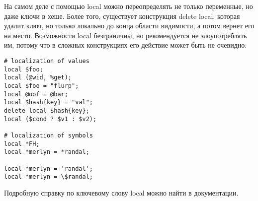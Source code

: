 На самом деле с помощью local можно переопределять не только переменные, но даже ключи в хеше. Более того, существует конструкция delete local, которая удалит ключ, но только локально до конца области видимости, а потом вернет его на место. Возможности local безграничны, но рекомендуется не злоупотреблять им, потому что в сложных конструкциях его действие может быть не очевидно:
\begin{verbatim}
# localization of values
local $foo;
local (@wid, %get);
local $foo = "flurp";
local @oof = @bar;
local $hash{key} = "val";
delete local $hash{key};
local ($cond ? $v1 : $v2);

# localization of symbols
local *FH;
local *merlyn = *randal;

local *merlyn = 'randal';
local *merlyn = \$randal;
\end{verbatim}
Подробную справку по ключевому слову local можно найти в документации.
